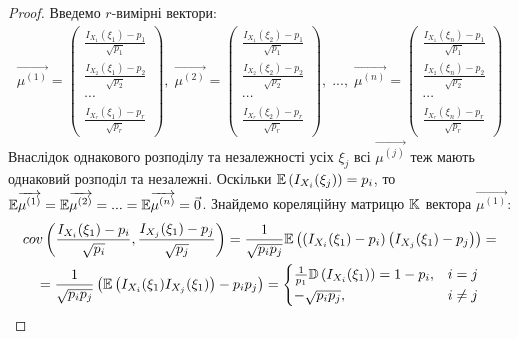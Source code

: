 \begin{proof}
    Введемо $r$-вимірні вектори:
    \begin{gather*}
        \overrightarrow{\mu^{(1)}} = \begin{pmatrix}
            \frac{I_{X_1}(\xi_1) - p_1}{\sqrt{p_1}} \\
            \frac{I_{X_2}(\xi_1) - p_2}{\sqrt{p_2}} \\
            \cdots \\
            \frac{I_{X_r}(\xi_1) - p_r}{\sqrt{p_r}}
        \end{pmatrix}, \;
        \overrightarrow{\mu^{(2)}} = \begin{pmatrix}
            \frac{I_{X_1}(\xi_2) - p_1}{\sqrt{p_1}} \\
            \frac{I_{X_2}(\xi_2) - p_2}{\sqrt{p_2}} \\
            \cdots \\
            \frac{I_{X_r}(\xi_2) - p_r}{\sqrt{p_r}}
        \end{pmatrix}, \;
        ..., \;
        \overrightarrow{\mu^{(n)}} = \begin{pmatrix}
            \frac{I_{X_1}(\xi_n) - p_1}{\sqrt{p_1}} \\
            \frac{I_{X_2}(\xi_n) - p_2}{\sqrt{p_2}} \\
            \cdots \\
            \frac{I_{X_r}(\xi_n) - p_r}{\sqrt{p_r}}
        \end{pmatrix}
    \end{gather*}
    Внаслідок однакового розподілу та незалежності усіх $\xi_j$ всі $\overrightarrow{\mu^{(j)}}$ теж мають однаковий розподіл та незалежні.
    Оскільки $\mathbb{E}\left(I_{X_i}(\xi_j)\right) = p_i$, то $\mathbb{E} \overrightarrow{\mu^{(1)}} = \mathbb{E} \overrightarrow{\mu^{(2)}} = ... = \mathbb{E} \overrightarrow{\mu^{(n)}} = \vec{0}$.
    Знайдемо кореляційну матрицю $\mathbb{K}$ вектора $\overrightarrow{\mu^{(1)}}$:
    \begin{gather*}
        {cov}\left(\frac{I_{X_i}(\xi_1) - p_i}{\sqrt{p_i}}, \frac{I_{X_j}(\xi_1) - p_j}{\sqrt{p_j}}\right) = 
        \frac{1}{\sqrt{p_i p_j}} \E\left(\left(I_{X_i}(\xi_1) - p_i\right)\left(I_{X_j}(\xi_1) - p_j\right)\right) = \\
        = \frac{1}{\sqrt{p_i p_j}} \left(\E\left(I_{X_i}(\xi_1) I_{X_j}(\xi_1)\right) - p_i p_j\right) = 
        \begin{cases}
            \frac{1}{p_1} \D\left(I_{X_i}(\xi_1)\right) = 1 - p_i, & i = j \\
            -\sqrt{p_i p_j}, & i\neq j
        \end{cases}

\end{gather*}
\end{proof}
